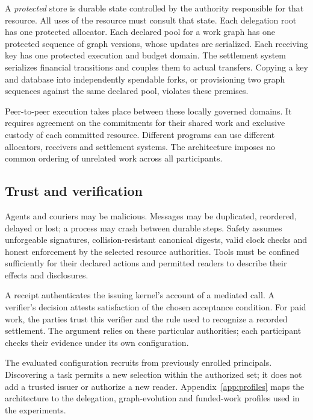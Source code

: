 A \emph{protected} store is durable state controlled by the authority responsible
for that resource. All uses of the resource must consult that state. Each
delegation root has one protected allocator. Each declared pool for a work graph
has one protected sequence of graph versions, whose updates are serialized.
Each receiving key has one protected execution and budget domain. The settlement
system serializes financial transitions and couples them to actual transfers.
Copying a key and database into independently spendable forks, or provisioning
two graph sequences against the same declared pool, violates these premises.

Peer-to-peer execution takes place between these locally governed domains.
It requires agreement on the commitments for their shared work and exclusive
custody of each committed resource. Different programs can use different
allocators, receivers and settlement systems. The architecture imposes no common
ordering of unrelated work across all participants.

\subsection{Trust and verification}
Agents and couriers may be malicious. Messages may be duplicated, reordered,
delayed or lost; a process may crash between durable steps. Safety assumes
unforgeable signatures, collision-resistant canonical digests, valid clock
checks and honest enforcement by the selected resource authorities. Tools must
be confined sufficiently for their declared actions and permitted readers to
describe their effects and disclosures.

A receipt authenticates the issuing kernel's account of a mediated call.
A verifier's decision attests satisfaction of the chosen acceptance condition.
For paid work, the parties trust this verifier and the rule used to recognize
a recorded settlement. The argument relies on these particular authorities;
each participant checks their evidence under its own configuration.

The evaluated configuration recruits from previously enrolled principals.
Discovering a task permits a new selection within the authorized set; it does
not add a trusted issuer or authorize a new reader. Appendix~\ref{app:profiles}
maps the architecture to the delegation, graph-evolution and funded-work
profiles used in the experiments.
